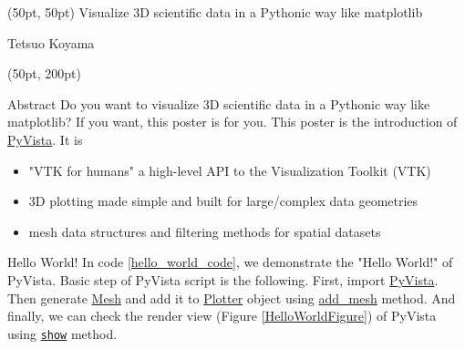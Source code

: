 \documentclass[final]{beamer}
\begin{document}
\begin{frame}[fragile]
\begin{textblock*}{3450pt}(50pt, 50pt)
\Huge Visualize 3D scientific data in a Pythonic way like matplotlib

\Large Tetsuo Koyama
\end{textblock*}

\begin{textblock*}{800pt}(50pt, 200pt)
\begin{block}{Abstract}
Do you want to visualize 3D scientific data in a Pythonic way like matplotlib?
If you want, this poster is for you.
This poster is the introduction of \href{https://pypi.org/project/pyvista/}{PyVista}.
It is
\begin{itemize}
\item "VTK for humans"\: a high-level API to the Visualization Toolkit (VTK)
\item 3D plotting made simple and built for large/complex data geometries
\item mesh data structures and filtering methods for spatial datasets
\end{itemize}

\end{block}
\begin{block}{Hello World!}
In code \ref{hello_world_code}, we demonstrate the "Hello World!" of PyVista.
Basic step of PyVista script is the following.
First, import \href{https://pypi.org/project/pyvista/}{PyVista}.
Then generate \href{https://docs.pyvista.org/getting-started/what-is-a-mesh.html}{Mesh} and add it to
\href{https://docs.pyvista.org/plotting/plotting.html#pyvista.Plotter}{Plotter} object using \href{https://docs.pyvista.org/plotting/plotting.html#pyvista.BasePlotter.add\_mesh}{add\_mesh} method.
And finally, we can check the render view (Figure \ref{HelloWorldFigure}) of PyVista using \href{https://docs.pyvista.org/plotting/plotting.html#pyvista.Plotter.show}{\texttt{show}} method.


\end{block}
\end{textblock*}
\end{frame}
\end{document}
